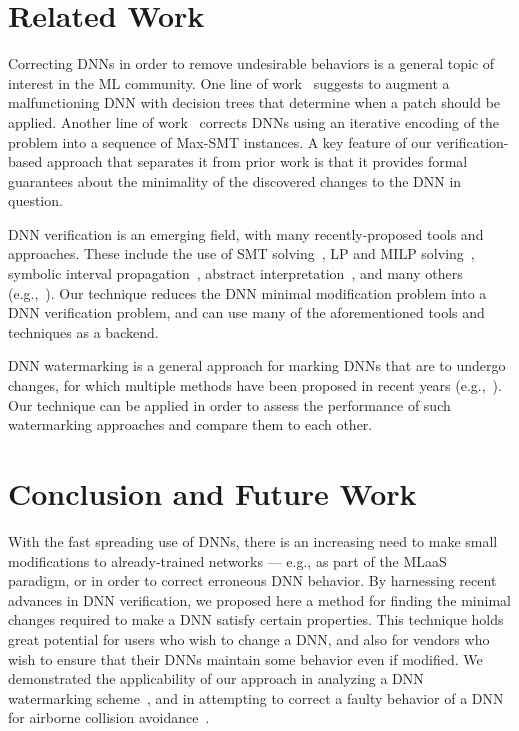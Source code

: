 \documentclass{easychair}
\begin{document}
\section{Related Work}
\label{sec:relatedWork}

Correcting DNNs in order to remove undesirable behaviors is a general
topic of interest in the ML community. One line of
work~\cite{KaLe18,KaFu18} suggests to augment a malfunctioning DNN
with decision trees that determine when a patch should be
applied. Another line of work~\cite{SoTh19} corrects DNNs using an
iterative encoding of the problem into a sequence of Max-SMT
instances. A key feature of our verification-based approach that
separates it from prior work is that it provides formal
guarantees about the minimality of the discovered changes to the DNN
in question.

DNN verification is an emerging field, with many recently-proposed
tools and approaches. These include the use of SMT
solving~\cite{HuKwWaWu17,KaBaDiJuKo17Reluplex,KaHuIbJuLaLiShThWuZeDiKoBa19Marabou},
LP and MILP solving~\cite{Ehlers2017,TjXiTe19}, symbolic interval
propagation~\cite{WaPeWhYaJa18}, abstract
interpretation~\cite{GeMiDrTsChVe18}, and many others
(e.g.,~\cite{BuTuToKoMu18,DuJhSaTi18,LoMa17,NaKaRySaWa17,SiGePuVe19}).
Our technique reduces the DNN minimal modification problem into a DNN
verification problem, and can use many of the aforementioned tools and
techniques as a backend.

DNN watermarking is a general approach for marking DNNs that are to undergo
changes, for which multiple methods have been proposed in recent years
(e.g.,~\cite{AdBaPiKeWatermarking,ChRoKo18,LePeTr19,UcNaSaSa17,VeUsTaOcGa11}).
Our technique can be applied in order to assess the
performance of such watermarking approaches and compare them to each other.


\section{Conclusion and Future Work}
\label{sec:conclusion}

With the fast spreading use of DNNs, there is an increasing need to
make small modifications to already-trained networks --- e.g., as part
of the MLaaS paradigm, or in order to correct erroneous DNN behavior. By
harnessing recent advances in DNN verification, we proposed here a
method for finding the minimal changes required to make a DNN satisfy
certain properties. This technique holds great potential
for users who wish to change a DNN, and also for vendors who
wish to ensure that their DNNs maintain some behavior even if
modified. We demonstrated the applicability of our approach in
analyzing a DNN watermarking scheme~\cite{AdBaPiKeWatermarking}, and
in attempting to correct a faulty behavior of a DNN for airborne
collision avoidance~\cite{JuLoBrOwKo16}.
\end{document}
